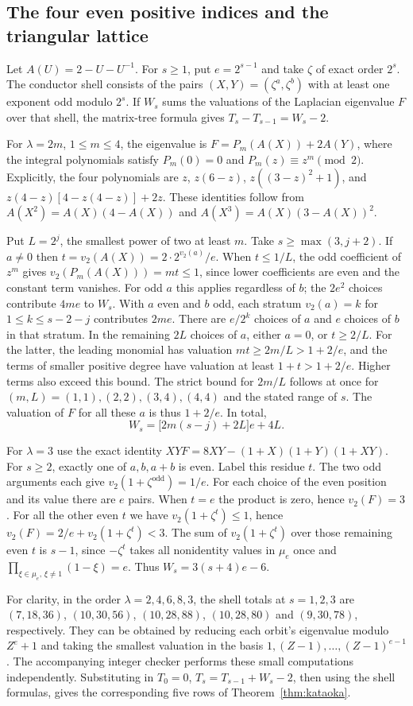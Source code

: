 \subsection{The four even positive indices and the triangular lattice}
Let $A(U)=2-U-U^{-1}$. For $s\ge1$, put $e=2^{s-1}$ and take $\zeta$
of exact order $2^s$. The conductor shell consists of the pairs
$(X,Y)=(\zeta^a,\zeta^b)$ with at least one exponent odd modulo $2^s$.
If $W_s$ sums the valuations of the Laplacian eigenvalue $F$ over that
shell, the matrix-tree formula gives $T_s-T_{s-1}=W_s-2$.

For $\lambda=2m$, $1\le m\le4$, the eigenvalue is
$F=P_m(A(X))+2A(Y)$, where the integral polynomials satisfy
$P_m(0)=0$ and $P_m(z)\equiv z^m\pmod2$. Explicitly, the four
polynomials are $z$, $z(6-z)$, $z((3-z)^2+1)$, and
$z(4-z)[4-z(4-z)]+2z$. These identities follow from
$A(X^2)=A(X)(4-A(X))$ and $A(X^3)=A(X)(3-A(X))^2$.

Put $L=2^j$, the smallest power of two at least $m$.
Take $s\ge\max(3,j+2)$. If $a\ne0$ then
$t=v_2(A(X))=2\cdot 2^{v_2(a)}/e$. When $t\le1/L$, the odd
coefficient of $z^m$ gives $v_2(P_m(A(X)))=mt\le1$, since lower
coefficients are even and the constant term vanishes.
For odd $a$ this applies regardless of $b$; the $2e^2$ choices
contribute $4me$ to $W_s$. With $a$ even and $b$ odd, each stratum
$v_2(a)=k$ for $1\le k\le s-2-j$ contributes $2me$. There are
$e/2^k$ choices of $a$ and $e$ choices of $b$ in that stratum.
In the remaining $2L$ choices of $a$, either $a=0$, or $t\ge2/L$.
For the latter, the leading monomial has valuation
$mt\ge 2m/L>1+2/e$, and the terms of smaller positive degree
have valuation at least $1+t>1+2/e$. Higher terms also exceed this
bound. The strict bound for $2m/L$ follows at once for
$(m,L)=(1,1),(2,2),(3,4),(4,4)$ and the stated range of $s$.
The valuation of $F$ for all these $a$ is thus $1+2/e$.
In total,
\[
 W_s=\big[2m(s-j)+2L\big]e+4L.
\]

For $\lambda=3$ use the exact identity
$XYF=8XY-(1+X)(1+Y)(1+XY)$. For $s\ge2$, exactly one of $a,b,a+b$
is even. Label this residue $t$. The two odd arguments each give
$v_2(1+\zeta^{\mathrm{odd}})=1/e$. For each choice of the even position
and its value there are $e$ pairs. When $t=e$ the product is zero,
hence $v_2(F)=3$. For all the other even $t$ we have
$v_2(1+\zeta^t)\le1$, hence $v_2(F)=2/e+v_2(1+\zeta^t)<3$.
The sum of $v_2(1+\zeta^t)$ over those remaining even $t$ is $s-1$,
since $-\zeta^t$ takes all nonidentity values in $\mu_e$ once and
$\prod_{\xi\in\mu_e,\,\xi\ne1}(1-\xi)=e$. Thus
$W_s=3(s+4)e-6$.

For clarity, in the order $\lambda=2,4,6,8,3$, the shell totals at
$s=1,2,3$ are $(7,18,36)$, $(10,30,56)$, $(10,28,88)$,
$(10,28,80)$ and $(9,30,78)$, respectively. They can be obtained by
reducing each orbit's eigenvalue modulo $Z^e+1$ and taking the smallest
valuation in the basis $1,(Z-1),\ldots,(Z-1)^{e-1}$. The accompanying
integer checker performs these small computations independently.
Substituting in $T_0=0$, $T_s=T_{s-1}+W_s-2$, then using the shell
formulas, gives the corresponding five rows of Theorem~\ref{thm:kataoka}.
